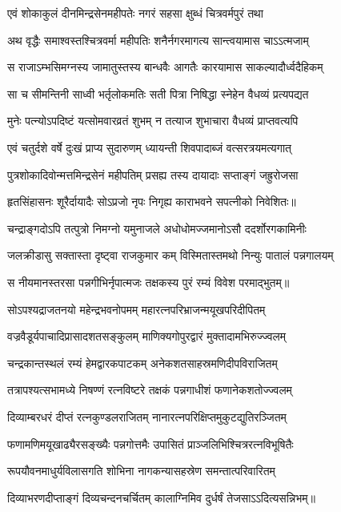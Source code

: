 \twolineshloka
{एवं शोकाकुलं दीनमिन्द्रसेनमहीपतेः}
{नगरं सहसा क्षुब्धं चित्रवर्मपुरं तथा} %

\twolineshloka
{अथ वृद्धैः समाश्वस्तश्चित्रवर्मा महीपतिः}
{शनैर्नगरमागत्य सान्त्वयामास चाऽऽत्मजाम्} %

\twolineshloka
{स राजाऽम्भसिमग्नस्य जामातुस्तस्य बान्धवैः}
{आगतैः कारयामास साकल्यादौर्ध्वदैहिकम्} %

\twolineshloka
{सा च सीमन्तिनी साध्वी भर्तृलोकमतिः सती}
{पित्रा निषिद्धा स्नेहेन वैधव्यं प्रत्यपद्यत} %

\twolineshloka
{मुनेः पत्न्योऽपदिष्टं यत्सोमवारव्रतं शुभम्}
{न तत्याज शुभाचारा वैधव्यं प्राप्तवत्यपि} %

\twolineshloka
{एवं चतुर्दशे वर्षे दुःखं प्राप्य सुदारुणम्}
{ध्यायन्ती शिवपादाब्जं वत्सरत्रयमत्यगात्} %

\twolineshloka
{पुत्रशोकादिवोन्मत्तमिन्द्रसेनं महीपतिम्}
{प्रसह्य तस्य दायादाः सप्ताङ्गं जह्रुरोजसा} %

\twolineshloka
{हृतसिंहासनः शूरैर्दायादैः सोऽप्रजो नृपः}
{निगृह्य काराभवने सपत्नीको निवेशितः॥} %

\twolineshloka
{चन्द्राङ्गदोऽपि तत्पुत्रो निमग्नो यमुनाजले}
{अधोधोमज्जमानोऽसौ ददर्शोरगकामिनीः} %

\twolineshloka
{जलक्रीडासु सक्तास्ता दृष्ट्वा राजकुमार कम्}
{विस्मितास्तमथो निन्युः पातालं पन्नगालयम्} %

\twolineshloka
{स नीयमानस्तरसा पन्नगीभिर्नृपात्मजः}
{तक्षकस्य पुरं रम्यं विवेश परमाद्भुतम्॥} %

\twolineshloka
{सोऽपश्यद्राजतनयो महेन्द्रभवनोपमम्}
{महारत्नपरिभ्राजन्मयूखपरिदीपितम्} %

\twolineshloka
{वज्रवैडूर्यपाचादिप्रासादशतसङ्कुलम्}
{माणिक्यगोपुरद्वारं मुक्तादामभिरुज्ज्वलम्} %

\twolineshloka
{चन्द्रकान्तस्थलं रम्यं हेमद्वारकपाटकम्}
{अनेकशतसाहस्रमणिदीपविराजितम्} %

\twolineshloka
{तत्रापश्यत्सभामध्ये निषण्णं रत्नविष्टरे}
{तक्षकं पन्नगाधीशं फणानेकशतोज्ज्वलम्} %

\twolineshloka
{दिव्याम्बरधरं दीप्तं रत्नकुण्डलराजितम्}
{नानारत्नपरिक्षिप्तमुकुटद्युतिरञ्जितम्} %

\twolineshloka
{फणामणिमयूखाढ्यैरसङ्ख्यैः पन्नगोत्तमैः}
{उपासितं प्राञ्जलिभिश्चित्ररत्नविभूषितैः} %

\twolineshloka
{रूपयौवनमाधुर्यविलासगति शोभिना}
{नागकन्यासहस्रेण समन्तात्परिवारितम्} %

\twolineshloka
{दिव्याभरणदीप्ताङ्गं दिव्यचन्दनचर्चितम्}
{कालाग्निमिव दुर्धर्षं तेजसाऽऽदित्यसन्निभम्॥} %

